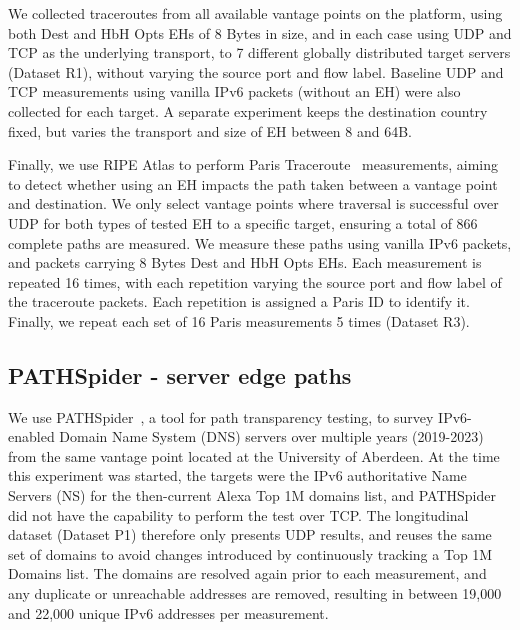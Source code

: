 \documentclass[conference]{IEEEtran}
\begin{document}
We collected traceroutes from all available vantage points on the platform, using both Dest and HbH Opts EHs of 8 Bytes in size, and in each case using UDP and TCP as the underlying transport, to 7 different globally distributed target servers (Dataset R1), without varying the source port and flow label. Baseline UDP and TCP measurements using vanilla IPv6 packets (without an EH) were also collected for each target.
A separate experiment keeps the destination country fixed, but varies the transport and size of EH between 8 and 64B.

Finally, we use RIPE Atlas to perform Paris Traceroute~\cite{augustin2006avoiding} measurements, aiming to detect whether using an EH impacts the path taken between a vantage point and destination. We only select vantage points where traversal is successful over UDP for both types of tested EH to a specific target, ensuring a total of 866 complete paths are measured.
We measure these paths using vanilla IPv6 packets, and packets carrying 8 Bytes Dest and HbH Opts EHs. Each measurement is repeated 16 times, with each repetition varying the source port and flow label of the traceroute packets. Each repetition is assigned a Paris ID to identify it. Finally, we repeat each set of 16 Paris measurements 5 times (Dataset R3).


    \subsection{PATHSpider - server edge paths}
    \label{sec:pathspider-methodology}

We use PATHSpider~\cite{learmonth2016pathspider}, a tool for path transparency testing, to survey IPv6-enabled Domain Name System (DNS) servers over multiple years (2019-2023) from the same vantage point located at the University of Aberdeen. At the time this experiment was started, the targets were the IPv6 authoritative Name Servers (NS) for the then-current Alexa Top 1M domains list, and PATHSpider did not have the capability to perform the test over TCP. The longitudinal dataset (Dataset P1) therefore only presents UDP results, and reuses the same set of domains to avoid changes introduced by continuously tracking a Top 1M Domains list. The domains are resolved again prior to each measurement, and any duplicate or unreachable addresses are removed, resulting in between 19,000 and 22,000 unique IPv6 addresses per measurement. 
\end{document}
